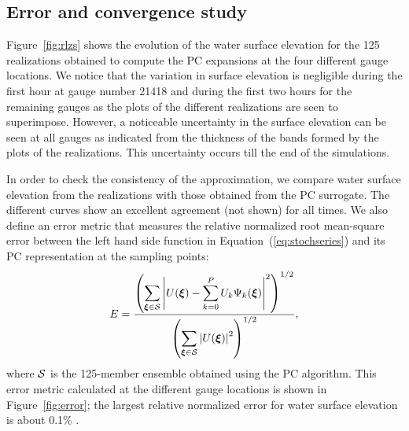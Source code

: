 \subsection{Error and convergence study}
\label{sec:analysis}

Figure~\ref{fig:rlzs} shows the evolution of the
water surface elevation for the 125 realizations obtained 
to compute the PC expansions at the four different gauge 
locations. We notice that the variation in surface elevation 
is negligible during the first hour at gauge number 21418 
and during the first two hours for the remaining gauges
as the plots of the different realizations are seen to superimpose.
However, a noticeable uncertainty in the surface 
elevation can be seen  at all gauges as indicated from the thickness 
of the bands formed by the plots of the realizations. This uncertainty
occurs till the end of the simulations.

In order to check the consistency of the approximation, we compare
 water surface elevation from the realizations 
with those obtained from the PC surrogate. The different curves
show an excellent agreement (not shown) for all times. We also define
an error metric that measures the relative normalized root mean-square error between the left hand side function 
in Equation~(\ref{eq:stochseries})
and its PC representation at the sampling points:
\begin{equation} 
   E = \frac{\displaystyle
         \left(\sum_{\xxi \in \NISP} \left|U(\xxi) - \sum_{k = 0}^{P}
U_k\Psi_k(\xxi)\right|^2
         \right)^{1/2}}
        {\displaystyle
          \left(\sum_{\xxi \in \NISP} \left|U(\xxi)\right|^2\right)^{1/2} 
          },
\label{eq:error}
\end{equation}
where $\mathcal{S}$ is the 125-member ensemble obtained using the PC algorithm. 
This error metric calculated at the different gauge locations is shown in Figure~\ref{fig:error};
the largest relative normalized error for 
water surface elevation is about 0.1\% . 



